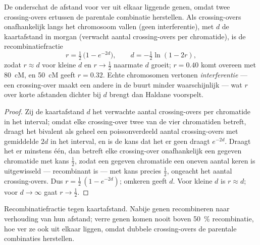 \begin{theorem}\label{thm:b2:meiosis-heredity:haldane}
De  onderschat de afstand voor ver uit elkaar
liggende genen, omdat twee crossing-overs ertussen de parentale
combinatie herstellen. Als crossing-overs onafhankelijk langs het
chromosoom vallen (geen interferentie), met $d$ de kaartafstand in morgan
(verwacht aantal crossing-overs per chromatide), is de recombinatiefractie
\[
r = \tfrac12\,\bigl(1 - e^{-2d}\bigr), \qquad d = -\tfrac12\ln(1 - 2r),
\]
zodat $r \approx d$ voor kleine $d$ en $r \to \tfrac12$ naarmate $d$
groeit; $r = 0.40$ komt overeen met \qty{80}{cM}, en \qty{50}{cM}
geeft $r = 0.32$. Echte chromosomen vertonen \emph{interferentie} --- een
crossing-over maakt een andere in de buurt minder waarschijnlijk --- wat
$r$ over korte afstanden dichter bij $d$ brengt dan Haldane voorspelt.
\end{theorem}
\begin{proof}
Zij de kaartafstand $d$ het verwachte aantal crossing-overs per
chromatide in het interval; omdat elke crossing-over twee van de
vier chromatiden betreft, draagt het bivalent als geheel een
poissonverdeeld aantal crossing-overs met gemiddelde $2d$ in het
interval, en is de kans dat het er geen draagt $e^{-2d}$. Draagt het er
minstens één, dan betreft elke crossing-over onafhankelijk een gegeven
chromatide met kans
$\tfrac12$, zodat een gegeven chromatide een oneven aantal keren is
uitgewisseld --- recombinant is --- met kans precies $\tfrac12$,
ongeacht het aantal crossing-overs. Dus $r = \tfrac12\,(1 -
e^{-2d})$; omkeren geeft $d$. Voor kleine $d$ is $r \approx d$; voor
$d \to \infty$ gaat $r \to \tfrac12$.
\end{proof}

\begin{omfigure}

{\small Recombinatiefractie tegen kaartafstand. Nabije genen recombineren
naar verhouding van hun afstand; verre genen komen nooit boven
\qty{50}{\%} recombinatie, hoe ver ze ook uit elkaar liggen, omdat dubbele
crossing-overs de parentale combinaties herstellen.}
\end{omfigure}

